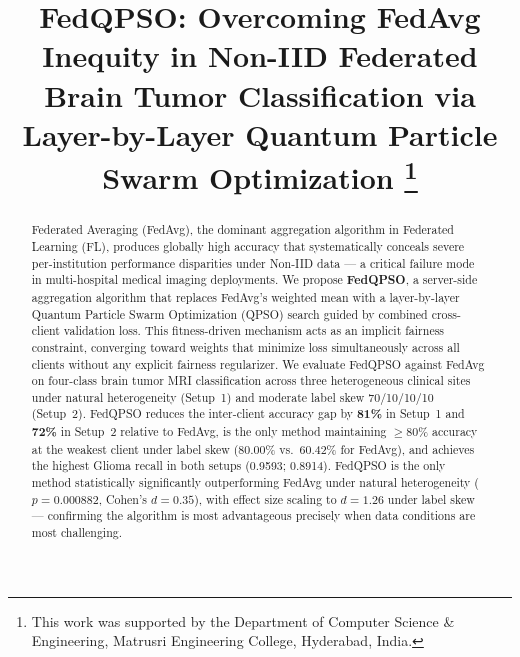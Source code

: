 \documentclass[conference]{IEEEtran}
\begin{document}

\title{FedQPSO: Overcoming FedAvg Inequity in Non-IID Federated Brain
Tumor Classification via Layer-by-Layer Quantum Particle Swarm Optimization
\thanks{This work was supported by the Department of Computer Science \&
Engineering, Matrusri Engineering College, Hyderabad, India.}}

\author{%
}

\maketitle

\begin{abstract}
Federated Averaging (FedAvg), the dominant aggregation algorithm in
Federated Learning (FL), produces globally high accuracy that systematically
conceals severe per-institution performance disparities under Non-IID data —
a critical failure mode in multi-hospital medical imaging deployments. We
propose \textbf{FedQPSO}, a server-side aggregation algorithm that replaces
FedAvg's weighted mean with a layer-by-layer Quantum Particle Swarm
Optimization (QPSO) search guided by combined cross-client validation loss.
This fitness-driven mechanism acts as an implicit fairness constraint,
converging toward weights that minimize loss simultaneously across all
clients without any explicit fairness regularizer. We evaluate FedQPSO
against FedAvg on four-class brain tumor MRI classification across three
heterogeneous clinical sites under natural heterogeneity (Setup~1) and
moderate label skew 70/10/10/10 (Setup~2). FedQPSO reduces the inter-client
accuracy gap by \textbf{81\%} in Setup~1 and \textbf{72\%} in Setup~2
relative to FedAvg, is the only method maintaining $\geq$80\% accuracy at
the weakest client under label skew (80.00\% vs.\ 60.42\% for FedAvg), and
achieves the highest Glioma recall in both setups (0.9593; 0.8914). FedQPSO
is the only method statistically significantly outperforming FedAvg under
natural heterogeneity ($p = 0.000882$, Cohen's $d = 0.35$), with effect size
scaling to $d = 1.26$ under label skew — confirming the algorithm is most
advantageous precisely when data conditions are most challenging.
\end{abstract}
\end{document}
